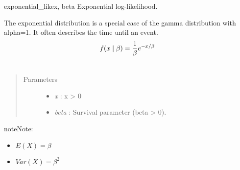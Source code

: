 \hypertarget{pymc.distributions.exponential_like}{}\begin{funcdesc}{exponential\_like}{x, beta}
Exponential log-likelihood.

The exponential distribution is a special case of the gamma distribution
with alpha=1. It often describes the time until an event.
\begin{gather}
\begin{split}f(x \mid \beta) = \frac{1}{\beta}e^{-x/\beta}\end{split}\notag\\\begin{split}\end{split}\notag
\end{gather}\begin{quote}\begin{description}
\item[Parameters] \leavevmode\begin{itemize}
\item {} 
\emph{x} : x \textgreater{} 0

\item {} 
\emph{beta} : Survival parameter (beta \textgreater{} 0).

\end{itemize}

\end{description}\end{quote}

\begin{notice}{note}{Note:}\begin{itemize}
\item {} 
$E(X) = \beta$

\item {} 
$Var(X) = \beta^2$

\end{itemize}
\end{notice}
\end{funcdesc}

